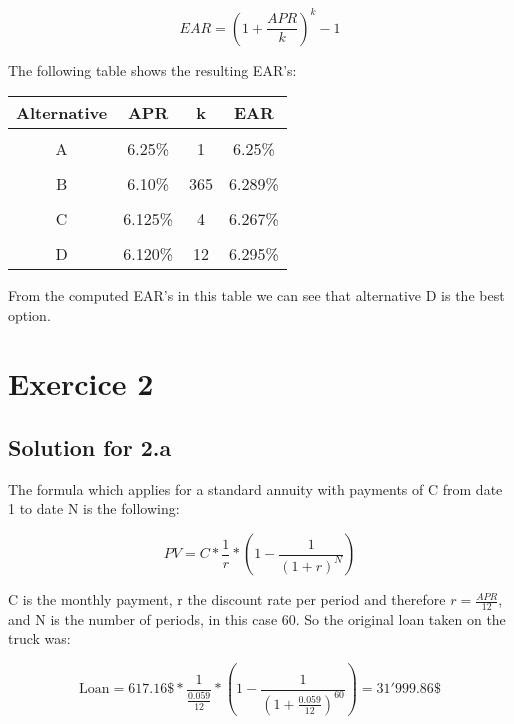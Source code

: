 \documentclass[a4paper,11pt,twoside]{article}
\begin{document}
\begin{equation}
\label{eq1.1}
EAR = (1+\frac{APR}{k})^k -1
\end{equation}

The following table shows the resulting EAR's:

\begin{center} 
\begin{tabular} { c  c  c  c  }
\textbf{Alternative} & \textbf{APR} & \textbf{k} &\textbf{EAR} \\
\hline\\[-7pt]
A & 6.25\% & 1 & 6.25\% \\
\hline\\[-7pt]
B & 6.10\% & 365 &  6.289\%\\
\hline\\[-7pt]
C & 6.125\% & 4 & 6.267\%\\
\hline\\[-7pt]
D & 6.120\% & 12 & 6.295\%\\
\end{tabular}
\end{center}

From the computed EAR's in this table we can see that alternative D is the best option.


\section{Exercice 2}

\subsection{Solution for 2.a}

The formula which applies for a standard annuity with payments of C from date 1 to date N is the following:

\begin{equation}
\label{eq2.1}
PV = C*\frac{1}{r}*(1-\frac{1}{(1+r)^N})
\end{equation}

C is the monthly payment, r the discount rate per period and therefore $r = \frac{APR}{12}$, and N is the number of periods, in this case 60. So the original loan taken on the truck was:

\begin{equation}
\text{Loan} = 617.16\$*\frac{1}{\frac{0.059}{12}}*(1-\frac{1}{(1+\frac{0.059}{12})^{60}}) = 31'999.86\$
\end{equation}
\end{document}
